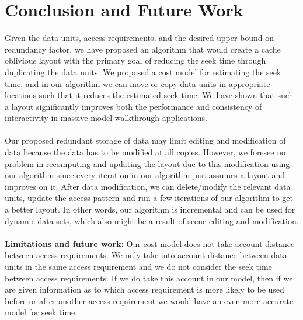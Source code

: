 
\section{Conclusion and Future Work}

Given the data units, access requirements, and the desired upper bound on
redundancy factor, we have proposed an algorithm that would create a cache
oblivious layout with the primary goal of reducing the seek time through
duplicating the data units. We proposed a cost model for estimating the seek
time, and in our algorithm we can move or copy data units in appropriate
locations such that it reduces the estimated seek time.  We have shown that
such a layout significantly improves both the performance and consistency of
interactivity in massive model walkthrough applications.  \\ \\
Our proposed redundant storage of data may limit editing and modification of data because the data has to be modified at all copies. However, we foresee no problem in recomputing and updating the layout due to this modification using our algorithm since every iteration in our algorithm just assumes a layout and improves on it. After data modification, we can delete/modify the relevant data units, update the access pattern and run a few iterations of our algorithm to get a better layout. In other words, our algorithm is incremental and can be used for dynamic data sets, which also might be a result of scene editing and modification.\\
\\
{\bf Limitations and future work:}
Our cost model does not take account distance between access requirements. We only take into account distance between data units in the same access requirement and we do not consider the seek time between access requirements. If we do take this account in our model, then if we are given information as to which access requirement is more likely to be used before or after another access requirement we would have an even more accurate model for seek time.


